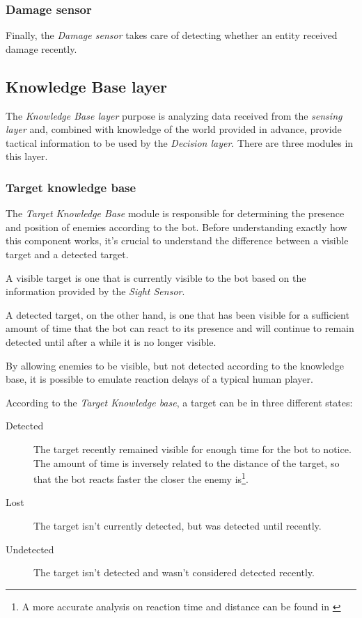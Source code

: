 \subsubsection{Damage sensor}
Finally, the \textit{Damage sensor} takes care of detecting whether an entity received damage recently.


\subsection{Knowledge Base layer}
The \textit{Knowledge Base layer} purpose is analyzing data received from the \textit{sensing layer} and, combined with knowledge of the world provided in advance, provide tactical information to be used by the \textit{Decision layer}.
There are three modules in this layer.

\subsubsection{Target knowledge base}
\label{subsubsection:target_knowledge_base}
The \textit{Target Knowledge Base} module is responsible for determining the presence and position of enemies according to the bot. 
Before understanding exactly how this component works, it's crucial to understand the difference between a visible target and a detected target.
 
A visible target is one that is currently visible to the bot based on the information provided by the \textit{Sight Sensor}. 

A detected target, on the other hand, is one that has been visible for a sufficient amount of time that the bot can react to its presence and will continue to remain detected until after a while it is no longer visible. 

By allowing enemies to be visible, but not detected according to the knowledge base, it is possible to emulate reaction delays of a typical human player.

According to the \textit{Target Knowledge base}, a target can be in three different states:
\begin{description}
\item[Detected] The target recently remained visible for enough time for the bot to notice. The amount of time is inversely related to the distance of the target, so that the bot reacts faster the closer the enemy is\footnote{A more accurate analysis on reaction time and distance can be found in \cite{rabin_reaction_time}}.
\item[Lost] The target isn't currently detected, but was detected until recently.
\item[Undetected] The target isn't detected and wasn't considered detected recently.
\end{description}

